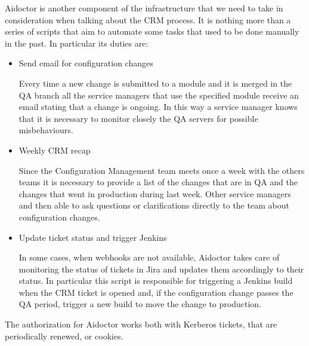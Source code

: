 Aidoctor is another component of the infrastructure that we need to take in
consideration when talking about the CRM process. It is nothing more than
a series of scripts that aim to automate some tasks that used to be done
manually in the past. In particular its duties are:

\begin{itemize}

  \item Send email for configuration changes

  Every time a new change is submitted to a module and it is merged in the QA
  branch all the service managers that use the specified module receive an
  email stating that a change is ongoing. In this way a service manager knows
  that it is necessary to monitor closely the QA servers for possible
  misbehaviours.

  \item Weekly CRM recap

  Since the Configuration Management team meets once a week with the others
  teams it is necessary to provide a list of the changes that are in QA and the
  changes that went in production during last week. Other service managers and
  then able to ask questions or clarifications directly to the team about
  configuration changes.

  \item Update ticket status and trigger Jenkins

  In some cases, when webhooks are not available, Aidoctor takes care of
  monitoring the status of tickets in Jira and updates them accordingly to
  their status. In particular this script is responsible for triggering
  a Jenkins build when the CRM ticket is opened and, if the configuration
  change passes the QA period, trigger a new build to move the change to
  production.

\end{itemize}

The authorization for Aidoctor works both with Kerberos tickets, that are
periodically renewed, or cookies.
